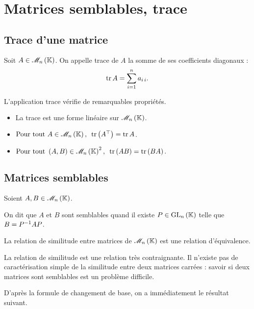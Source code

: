 \section{Matrices semblables, trace}

\subsection{Trace d'une matrice}

\begin{defi}
Soit \(A\in\M{n}\). On appelle trace de \(A\) la somme de ses coefficients diagonaux : \[\operatorname{tr} A=\sum_{i=1}^na_{i\,i}.\]
\end{defi}

L'application trace vérifie de remarquables propriétés.

\begin{prop}
\begin{itemize}
    \item La trace est une forme linéaire sur \(\M{n}\). \\
    \item \(\quantifs{\Tpt A\in\M{n}}\tr\paren{\trans{A}}=\tr A\). \\
    \item \(\quantifs{\Tpt\paren{A,B}\in\M{n}^2}\tr\paren{AB}=\tr\paren{BA}\).
\end{itemize}
\end{prop}

\subsection{Matrices semblables}

\begin{defi}
Soient \(A,B\in\M{n}\).

On dit que \(A\) et \(B\) sont semblables quand il existe \(P\in\GL{n}\) telle que \(B=P^{-1} AP\).
\end{defi}

\begin{prop}
La relation de similitude entre matrices de \(\M{n}\) est une relation d'équivalence.
\end{prop}

La relation de similitude est une relation très contraignante. Il n'existe pas de caractérisation simple de la similitude entre deux matrices carrées : savoir si deux matrices sont semblables est un problème difficile.

D'après la formule de changement de base, on a immédiatement le résultat suivant.

